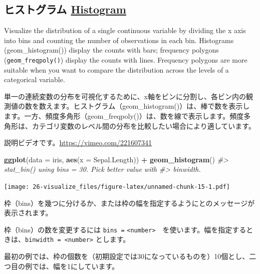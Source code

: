\documentclass[
  xelatex, ja=standard]{bxjsbook}
\newenvironment{Shaded}{\begin{snugshade}}{\end{snugshade}}
\newcommand{\AttributeTok}[1]{\textcolor[rgb]{0.13,0.29,0.53}{#1}}
\newcommand{\CommentTok}[1]{\textcolor[rgb]{0.56,0.35,0.01}{\textit{#1}}}
\newcommand{\FunctionTok}[1]{\textcolor[rgb]{0.13,0.29,0.53}{\textbf{#1}}}
\newcommand{\NormalTok}[1]{#1}
\newcommand{\SpecialCharTok}[1]{\textcolor[rgb]{0.81,0.36,0.00}{\textbf{#1}}}
\theoremstyle{definition}
\theoremstyle{definition}
\theoremstyle{definition}
\theoremstyle{definition}
\theoremstyle{remark}
\begin{document}
\hypertarget{ux30d2ux30b9ux30c8ux30b0ux30e9ux30e0-histogram}{%
\subsection{\texorpdfstring{ヒストグラム \href{https://ggplot2.tidyverse.org/reference/geom_histogram.html}{Histogram}}{ヒストグラム Histogram}}\label{ux30d2ux30b9ux30c8ux30b0ux30e9ux30e0-histogram}}

Visualize the distribution of a single continuous variable by dividing the x axis into bins and counting the number of observations in each bin. Histograms (geom\_histogram()) display the counts with bars; frequency polygons (\texttt{geom\_freqpoly()}) display the counts with lines. Frequency polygons are more suitable when you want to compare the distribution across the levels of a categorical variable.

単一の連続変数の分布を可視化するために、x軸をビンに分割し、各ビン内の観測値の数を数えます。ヒストグラム（geom\_histogram()）は、棒で数を表示します。一方、頻度多角形（geom\_freqpoly()）は、数を線で表示します。頻度多角形は、カテゴリ変数のレベル間の分布を比較したい場合により適しています。

説明ビデオです。\url{https://vimeo.com/221607341}

\begin{Shaded}
\begin{Highlighting}[]
\FunctionTok{ggplot}\NormalTok{(}\AttributeTok{data =}\NormalTok{ iris, }\FunctionTok{aes}\NormalTok{(}\AttributeTok{x =}\NormalTok{ Sepal.Length)) }\SpecialCharTok{+}
  \FunctionTok{geom\_histogram}\NormalTok{()}
\CommentTok{\#\textgreater{} \textasciigrave{}stat\_bin()\textasciigrave{} using \textasciigrave{}bins = 30\textasciigrave{}. Pick better value with}
\CommentTok{\#\textgreater{} \textasciigrave{}binwidth\textasciigrave{}.}
\end{Highlighting}
\end{Shaded}

\texttt{[image: 26-visualize\_files/figure-latex/unnamed-chunk-15-1.pdf]}

枠（bins）を幾つに分けるか、または枠の幅を指定するようにとのメッセージが表示されます。

枠（bins）の数を変更するには \texttt{bins\ =} \texttt{\textless{}number\textgreater{}}　を使います。幅を指定するときは、\texttt{binwidth\ =\ \textless{}number\textgreater{}} とします。

最初の例では、枠の個数を（初期設定では30になっているものを）10個とし、二つ目の例では、幅を1にしています。
\end{document}
